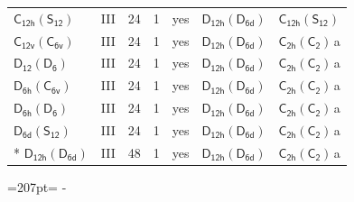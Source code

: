\documentclass[10pt,a4paper]{article}
\newcommand{\needspace}[1]{\par\penalty-100\begingroup\dimen0=#1\relax\dimen2=\pagegoal
  \advance\dimen2-\pagetotal\ifdim\dimen0>\dimen2\relax\ifdim\dimen2>0pt\vfil\break\fi\fi
  \endgroup}
\numberwithin{equation}{section}
\newcommand{\grp}[1]{\mathsf{#1}}
\newcommand{\clsletter}[1]{\,{\scriptsize\color{black!55}#1}}
\begin{document}
{\begin{longtable}{@{}llrrlll@{}}
\href{C12h-S12.pdf}{$\grp{C_{12h}}(\grp{S_{12}})$} & III & 24 & 1 & yes & \href{D12h-D6d.pdf}{$\grp{D_{12h}}(\grp{D_{6d}})$} & \href{C12h-S12.pdf}{$\grp{C_{12h}}(\grp{S_{12}})$}\\
\href{C12v-C6v.pdf}{$\grp{C_{12v}}(\grp{C_{6v}})$} & III & 24 & 1 & yes & \href{D12h-D6d.pdf}{$\grp{D_{12h}}(\grp{D_{6d}})$} & \href{C2h-C2.pdf}{$\grp{C_{2h}}(\grp{C_{2}})$}\clsletter{a}\\
\href{D12-D6.pdf}{$\grp{D_{12}}(\grp{D_{6}})$} & III & 24 & 1 & yes & \href{D12h-D6d.pdf}{$\grp{D_{12h}}(\grp{D_{6d}})$} & \href{C2h-C2.pdf}{$\grp{C_{2h}}(\grp{C_{2}})$}\clsletter{a}\\
\href{D6h-C6v.pdf}{$\grp{D_{6h}}(\grp{C_{6v}})$} & III & 24 & 1 & yes & \href{D12h-D6d.pdf}{$\grp{D_{12h}}(\grp{D_{6d}})$} & \href{C2h-C2.pdf}{$\grp{C_{2h}}(\grp{C_{2}})$}\clsletter{a}\\
\href{D6h-D6.pdf}{$\grp{D_{6h}}(\grp{D_{6}})$} & III & 24 & 1 & yes & \href{D12h-D6d.pdf}{$\grp{D_{12h}}(\grp{D_{6d}})$} & \href{C2h-C2.pdf}{$\grp{C_{2h}}(\grp{C_{2}})$}\clsletter{a}\\
\href{D6d-S12.pdf}{$\grp{D_{6d}}(\grp{S_{12}})$} & III & 24 & 1 & yes & \href{D12h-D6d.pdf}{$\grp{D_{12h}}(\grp{D_{6d}})$} & \href{C2h-C2.pdf}{$\grp{C_{2h}}(\grp{C_{2}})$}\clsletter{a}\\*
\href{D12h-D6d.pdf}{$\grp{D_{12h}}(\grp{D_{6d}})$} & III & 48 & 1 & yes & \href{D12h-D6d.pdf}{$\grp{D_{12h}}(\grp{D_{6d}})$} & \href{C2h-C2.pdf}{$\grp{C_{2h}}(\grp{C_{2}})$}\clsletter{a}\\
\bottomrule\end{longtable}}
\needspace{207pt}
\end{document}
